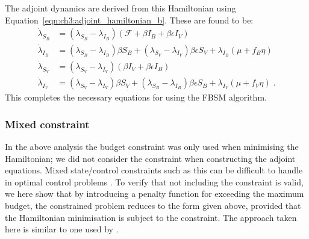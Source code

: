 The adjoint dynamics are derived from this Hamiltonian using Equation~\ref{eqn:ch3:adjoint_hamiltonian_b}. These are found to be:
\begin{subequations}\label{eqn:ch3:adjoint_dynamics}
    \begin{align}
    \dot{\lambda}_{S_B} &= \left(\lambda_{S_B} - \lambda_{I_B}\right)\left(\mathcal{F} + \beta{}I_B+\beta\epsilon{}I_V\right) \label{eqn:ch3:adjoint_dynamics_a} \\
    \dot{\lambda}_{I_B} &= \left(\lambda_{S_B} - \lambda_{I_B}\right)\beta{}S_B + \left(\lambda_{S_V} - \lambda_{I_V}\right)\beta\epsilon{}S_V + \lambda_{I_B}\left(\mu + f_B\eta\right) \label{eqn:ch3:adjoint_dynamics_b} \\
    \dot{\lambda}_{S_V} &= \left(\lambda_{S_V} - \lambda_{I_V}\right)\left(\beta{}I_V+\beta\epsilon{}I_B\right) \label{eqn:ch3:adjoint_dynamics_c} \\
    \dot{\lambda}_{I_V} &= \left(\lambda_{S_V} - \lambda_{I_V}\right)\beta{}S_V + \left(\lambda_{S_B} - \lambda_{I_B}\right)\beta\epsilon{}S_B + \lambda_{I_V}\left(\mu + f_V\eta\right)\;. \label{eqn:ch3:adjoint_dynamics_d}
    \end{align}
\end{subequations}
This completes the necessary equations for using the FBSM algorithm.

\subsubsection{Mixed constraint}

In the above analysis the budget constraint was only used when minimising the Hamiltonian; we did not consider the constraint when constructing the adjoint equations. Mixed state/control constraints such as this can be difficult to handle in optimal control problems \citep{hartl_survey_1995}. To verify that not including the constraint is valid, we here show that by introducing a penalty function for exceeding the maximum budget, the constrained problem reduces to the form given above, provided that the Hamiltonian minimisation is subject to the constraint. The approach taken here is similar to one used by \citet[Chapter 4]{sage_optimum_1968}.

